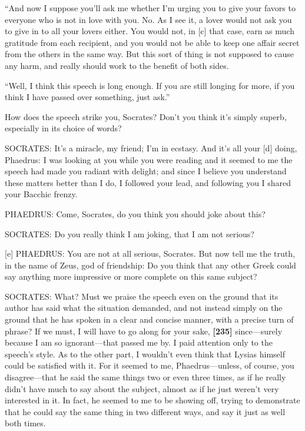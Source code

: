 “And now I suppose you'll ask me whether I'm urging you to give your
favors to everyone who is not in love with you. No. As I see it, a lover
would not ask you to give in to all your lovers either. You would not,
in {[}c{]} that case, earn as much gratitude from each recipient, and
you would not be able to keep one affair secret from the others in the
same way. But this sort of thing is not supposed to cause any harm, and
really should work to the benefit of both sides.

“Well, I think this speech is long enough. If you are still longing for
more, if you think I have passed over something, just ask.”

How does the speech strike you, Socrates? Don't you think it's simply
superb, especially in its choice of words?

SOCRATES: It's a miracle, my friend; I'm in ecstasy. And it's all your
{[}d{]} doing, Phaedrus: I was looking at you while you were reading and
it seemed to me the speech had made you radiant with delight; and since
I believe you understand these matters better than I do, I followed your
lead, and following you I shared your Bacchic frenzy.

PHAEDRUS: Come, Socrates, do you think you should joke about this?

SOCRATES: Do you really think I am joking, that I am not serious?

{[}e{]} PHAEDRUS: You are not at all serious, Socrates. But now tell me
the truth, in the name of Zeus, god of friendship: Do you think that any
other Greek could say anything more impressive or more complete on this
same subject?

SOCRATES: What? Must we praise the speech even on the ground that its
author has said what the situation demanded, and not instead simply on
the ground that he has spoken in a clear and concise manner, with a
precise turn of phrase? If we must, I will have to go along for your
sake, {\bf {[}235{]}} since---surely because I am so ignorant---that
passed me by. I paid attention only to the speech's style. As to the
other part, I wouldn't even think that Lysias himself could be satisfied
with it. For it seemed to me, Phaedrus---unless, of course, you
disagree---that he said the same things two or even three times, as if
he really didn't have much to say about the subject, almost as if he
just weren't very interested in it. In fact, he seemed to me to be
showing off, trying to demonstrate that he could say the same thing in
two different ways, and say it just as well both times.

